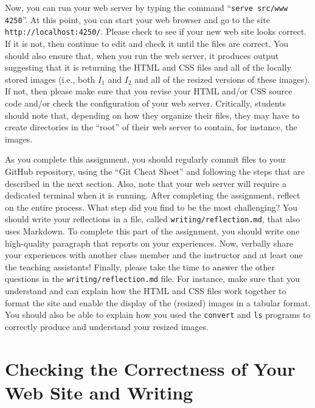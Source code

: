 \documentclass[11pt]{article}
\newcommand{\reflection}{\lstinline{writing/reflection.md}}
\newcommand{\command}[1]{``\lstinline{#1}''}
\newcommand{\program}[1]{\lstinline{#1}}
\newcommand{\url}[1]{\lstinline{#1}}
\begin{document}
Now, you can run your web server by typing the command \command{serve src/www
4250}. At this point, you can start your web browser and go to the site
\url{http://localhost:4250/}. Please check to see if your new web site looks
correct. If it is not, then continue to edit and check it until the files are
correct. You should also ensure that, when you run the web server, it produces
output suggesting that it is returning the HTML and CSS files and all of the
locally stored images (i.e., both $I_1$ and $I_2$ and all of the resized
versions of these images). If not, then please make sure that you revise your
HTML and/or CSS source code and/or check the configuration of your web server.
Critically, students should note that, depending on how they organize their
files, they may have to create directories in the ``root'' of their web server
to contain, for instance, the images.


As you complete this assignment, you should regularly commit files to your
GitHub repository, using the ``Git Cheat Sheet'' and following the steps that
are described in the next section. Also, note that your web server will require
a dedicated terminal when it is running. After completing the assignment,
reflect on the entire process. What step did you find to be the most
challenging? You should write your reflections in a file, called \reflection{},
that also uses Markdown. To complete this part of the assignment, you should
write one high-quality paragraph that reports on your experiences. Now, verbally
share your experiences with another class member and the instructor and at least
one the teaching assistants! Finally, please take the time to answer the other
questions in the \reflection{} file. For instance, make sure that you understand
and can explain how the HTML and CSS files work together to format the site and
enable the display of the (resized) images in a tabular format. You should also
be able to explain how you used the \program{convert} and \program{ls} programs
to correctly produce and understand your resized images.

\section*{Checking the Correctness of Your Web Site and Writing}
\end{document}
